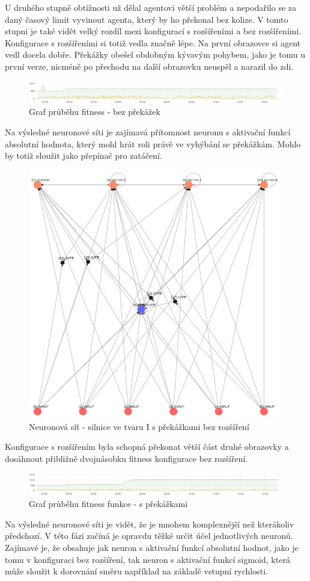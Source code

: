 U druhého stupně obtížnosti už dělal agentovi větší problém a nepodařilo se za daný časový limit vyvinout agenta, který by ho překonal bez kolize. V tomto stupni je také vidět velký rozdíl mezi konfigurací s rozšířeními a bez rozšířeními. Konfigurace s rozšířeními si totiž vedla značně lépe.
Na první obrazovce si agent vedl docela dobře. Překážky obešel obdobným kývavým pohybem, jako je tomu u první verze, nicméně po přechodu na další obrazovku neuspěl a narazil do zdi.
\begin{figure}[H]
	\centering
	\includegraphics[width=0.7\linewidth]{solutions/IWithObstructions/basicGraph}
	\caption{Graf průběhu fitness - bez překážek}
	\label{fig:obstructionsBasicgraph}
\end{figure}
Na výsledné neuronové síti je zajímavá přítomnost neuronu s aktivační funkcí absolutní hodnota, který mohl hrát roli právě ve vyhýbání se překážkám. Mohlo by totiž sloužit jako přepínač pro zatáčení.
\begin{figure}[H]
	\centering
	\includegraphics[width=0.7\linewidth]{solutions/IWithObstructions/basic}
	\caption{Neuronová síť - silnice ve tvaru I s překážkami bez rozšíření}
	\label{fig:basic}
\end{figure}
Konfigurace s rozšířením byla schopná překonat větší část druhé obrazovky a dosáhnout přibližně dvojnásobku fitness konfigurace bez rozšíření.
\begin{figure}[H]
	\centering
	\includegraphics[width=0.7\linewidth]{solutions/IWithObstructions/advancedGraph}
	\caption{Graf průběhu fitness funkce - s překážkami}
	\label{fig:advancedgraph}
\end{figure}
Na výsledné neuronové síti je vidět, že je mnohem komplexnější než kterákoliv předchozí. V této fázi začíná je opravdu těžké určit účel jednotlivých neuronů. Zajímavé je, že obsahuje jak neuron s aktivační funkcí absolutní hodnot, jako je tomu v konfiguraci bez rozšíření, tak neuron s aktivační funkcí sigmoid, která může sloužit k dorovnání směru například na základě vstupní rychlosti.

